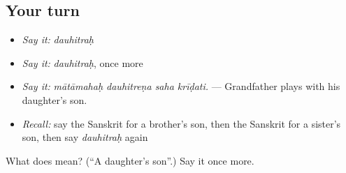 \subsection*{Your turn}
\begin{itemize}
\raggedright
  \item \emph{Say it:} \emph{dauhitraḥ}
  \item \emph{Say it:} \emph{dauhitraḥ}, once more
  \item \emph{Say it:} \emph{mātāmahaḥ dauhitreṇa saha krīḍati.} — Grandfather plays with his daughter's son.
  \item \emph{Recall:} say the Sanskrit for a brother's son, then the Sanskrit for a sister's son, then say \emph{dauhitraḥ} again
\end{itemize}

\begin{tcolorbox}[breakable,colback=teal!4,colframe=teal!35!black,title={Before you move on}]
What does  mean? (\textquotedblleft{}A daughter's son\textquotedblright{}.) Say it once more.
\end{tcolorbox}
